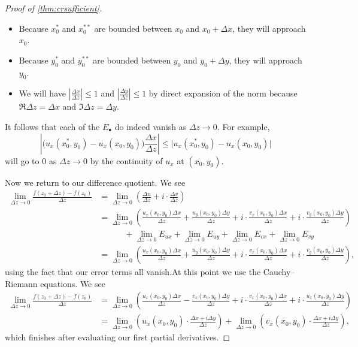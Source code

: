 \begin{proof}[Proof of \autoref{thm:crsufficient}]
\begin{itemize}
		\item Because $x_0^*$ and $x_0^{**}$ are bounded between $x_0$ and $x_0+\Delta x$, they will approach $x_0$.
		\item Because $y_0^*$ and $y_0^{**}$ are bounded between $y_0$ and $y_0+\Delta y$, they will approach $y_0$.
		\item We will have $\left|\frac{\Delta x}{\Delta z}\right|\le1$ and $\left|\frac{\Delta y}{\Delta z}\right|\le1$ by direct expansion of the norm because $\Re\Delta z=\Delta x$ and $\Im\Delta z=\Delta y$.
	\end{itemize}
	It follows that each of the $E_\bullet$ do indeed vanish as $\Delta z\to0$. For example,
	\[\left|\big(u_x(x_0^*,y_0)-u_x(x_0,y_0)\big)\frac{\Delta x}{\Delta z}\right|\le\big|u_x(x_0^*,y_0)-u_x(x_0,y_0)\big|\]
	will go to $0$ as $\Delta z\to0$ by the continuity of $u_x$ at $(x_0,y_0)$.

	Now we return to our difference quotient. We see
	\begin{align*}
		\lim_{\Delta z\to0}\frac{f(z_0+\Delta z)-f(z_0)}{\Delta z} &= \lim_{\Delta z\to0}\left(\frac{\Delta u}{\Delta z}+i\cdot\frac{\Delta v}{\Delta z}\right) \\
		&= \lim_{\Delta z\to0}\left(\frac{u_x(x_0,y_0)\Delta x}{\Delta z}+\frac{u_y(x_0,y_0)\Delta y}{\Delta z}+i\cdot\frac{v_x(x_0,y_0)\Delta x}{\Delta z}+i\cdot\frac{v_y(x_0,y_0)\Delta y}{\Delta z}\right) \\
		&\qquad\quad+\lim_{\Delta z\to0}E_{ux}+\lim_{\Delta z\to0}E_{uy}+\lim_{\Delta z\to0}E_{vx}+\lim_{\Delta z\to0}E_{vy} \\
		&= \lim_{\Delta z\to0}\left(\frac{u_x(x_0,y_0)\Delta x}{\Delta z}+\frac{u_y(x_0,y_0)\Delta y}{\Delta z}+i\cdot\frac{v_x(x_0,y_0)\Delta x}{\Delta z}+i\cdot\frac{v_y(x_0,y_0)\Delta y}{\Delta z}\right),
	\end{align*}
	using the fact that our error terms all vanish.At this point we use the Cauchy--Riemann equations. We see
	\begin{align*}
		\lim_{\Delta z\to0}\frac{f(z_0+\Delta z)-f(z_0)}{\Delta z} &= \lim_{\Delta z\to0}\left(\frac{u_x(x_0,y_0)\Delta x}{\Delta z}-\frac{v_x(x_0,y_0)\Delta y}{\Delta z}+i\cdot\frac{v_x(x_0,y_0)\Delta x}{\Delta z}+i\cdot\frac{u_x(x_0,y_0)\Delta y}{\Delta z}\right) \\
		&= \lim_{\Delta z\to0}\left(u_x(x_0,y_0)\cdot\frac{\Delta x+i\Delta y}{\Delta z}\right)+\lim_{\Delta z\to0}\left(v_x(x_0,y_0)\cdot\frac{\Delta x+i\Delta y}{\Delta z}\right),
	\end{align*}
	which finishes after evaluating our first partial derivatives.
\end{proof}